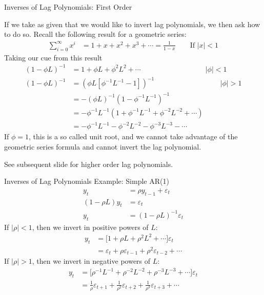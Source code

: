 \documentclass[aspectratio=169, handout]{beamer}
\begin{document}
{\footnotesize
\begin{frame}{Inverses of Lag Polynomials: First Order}

If we take as given that we would like to invert lag polynomials, we
then ask how to do so.
Recall the following result for a geometric series:
\begin{align*}
  \sum_{i=0}^\infty
  x^i
  &=
  1 + x + x^2 + x^3 + \cdots
  =
  \frac{1}{1-x}
  \qquad
  \text{If $|x|<1$}
\end{align*}
Taking our cue from this result
\begin{align*}
  (1-\phi L)^{-1}
  &=
  1 + \phi L + \phi^2 L^2 + \cdots
  \qquad
  \qquad
  \qquad
  \qquad
  \quad
  |\phi|<1
  \\
  (1-\phi L)^{-1}
  &=
  (\phi L[\phi^{-1} L^{-1}-1])^{-1}
  \qquad
  \qquad
  \qquad
  \qquad
  \quad
  \,
  |\phi|>1
  \\
  &=
  -(\phi L)^{-1}(1-\phi^{-1} L^{-1})^{-1}
  \\
  &=
  -
  \phi^{-1}L^{-1}
  (1+ \phi^{-1}L^{-1} + \phi^{-2}L^{-2} + \cdots)
  \\
  &=
  -
  \phi^{-1}L^{-1} - \phi^{-2}L^{-2} - \phi^{-3}L^{-3} - \cdots
\end{align*}
If $\phi=1$, this is a so called \alert{unit root}, and we cannot
take advantage of the geometric series formula and cannot invert the lag
polynomial.

See subsequent slide for higher order lag polynomials.
\end{frame}
}


{\footnotesize
\begin{frame}{Inverses of Lag Polynomials}
Example: Simple AR(1)
\begin{align*}
  y_t
  &= \rho y_{t-1} + \varepsilon_t
  \\
  (1-\rho L) y_t
  &= \varepsilon_t
  \\
  y_t
  &= (1-\rho L)^{-1}\varepsilon_t
\end{align*}
If $|\rho|<1$, then we invert in \alert{positive} powers of $L$:
\begin{align*}
  y_t
  &=
  \big[
    1 + \rho L + \rho^2L^2 + \cdots
  \big]
  \varepsilon_t
  \\
  &=
  \varepsilon_t
  + \rho \varepsilon_{t-1}
  + \rho^2 \varepsilon_{t-2}
  + \cdots
\end{align*}
If $|\rho|>1$, then we invert in \alert{negative} powers of $L$:
\begin{align*}
  y_t
  &=
  \big[
    \rho^{-1}L^{-1}
    + \rho^{-2}L^{-2}
    + \rho^{-3}L^{-3}
    + \cdots
  \big]
  \varepsilon_t
  \\
  &=
  \frac{1}{\rho}\varepsilon_{t+1}
  + \frac{1}{\rho^2}\varepsilon_{t+2}
  + \frac{1}{\rho^3}\varepsilon_{t+3}
  + \cdots
\end{align*}
\end{frame}
}
\end{document}
